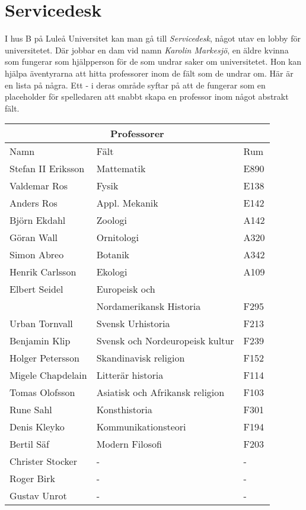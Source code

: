 \section{Servicedesk}
\label{loc:Servicedesk}
I hus B på Luleå Universitet kan man gå till \textit{Servicedesk}, något utav en lobby för universitetet. Där jobbar en dam vid namn \textit{Karolin Markesjö}, en äldre kvinna som fungerar som hjälpperson för de som undrar saker om universitetet. Hon kan hjälpa äventyrarna att hitta professorer inom de fält som de undrar om. Här är en lista på några. Ett - i deras område syftar på att de fungerar som en placeholder för spelledaren att snabbt skapa en professor inom något abstrakt fält.

\begin{center}
	\label{tab:Professorer}
	\begin{tabular}{ | l | l | l |  }
		\hline
		\multicolumn{3}{|c|}{Professorer} \\
		\hline
		Namn & Fält & Rum \\ 
		\hline
		Stefan II Eriksson & Mattematik & E890 \\
		Valdemar Ros & Fysik & E138 \\
		Anders Ros & Appl. Mekanik & E142 \\
		Björn Ekdahl & Zoologi & A142 \\
		Göran Wall & Ornitologi & A320 \\
		Simon Abreo & Botanik & A342 \\
		Henrik Carlsson & Ekologi & A109 \\
		Elbert Seidel & Europeisk och & \\ 
		 & Nordamerikansk Historia & F295 \\
		Urban Tornvall & Svensk Urhistoria & F213 \\
		Benjamin Klip & Svensk och Nordeuropeisk kultur & F239 \\
		Holger Petersson & Skandinavisk religion & F152 \\
		Migele Chapdelain & Litterär historia & F114 \\
		Tomas Olofsson & Asiatisk och Afrikansk religion & F103 \\
		Rune Sahl & Konsthistoria & F301 \\
		Denis Kleyko & Kommunikationsteori & F194 \\
		Bertil Säf & Modern Filosofi & F203 \\
		Christer Stocker & - & - \\
		Roger Birk & - & - \\
		Gustav Unrot & - & - \\
		\hline
	\end{tabular}
\end{center}

